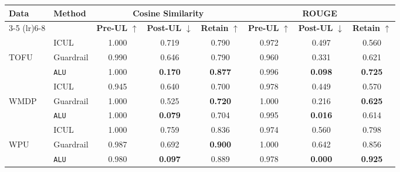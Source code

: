 \begin{table*}[]
    \centering
    \caption{Comparison of Methods using Cosine Similarity and ROUGE Metrics with Llama-3.1 8B}
    \begin{tabular}{llccc|ccc}
        \toprule
        \textbf{Data}&\textbf{Method} & \multicolumn{3}{c}{\textbf{Cosine Similarity}} & \multicolumn{3}{c}{\textbf{ROUGE}} \\
        \cmidrule(lr){3-5} \cmidrule(lr){6-8}
         & & \textbf{Pre-UL} $\uparrow$ & \textbf{Post-UL} $\downarrow$ & \textbf{Retain} $\uparrow$ & \textbf{Pre-UL} $\uparrow$ & \textbf{Post-UL} $\downarrow$ & \textbf{Retain} $\uparrow$ \\
        \midrule
        &ICUL & 1.000 & 0.719 & 0.790 & 0.972 & 0.497 & 0.560 \\
        TOFU &Guardrail & 0.990 & 0.646 & 0.790 & 0.960 & 0.331 & 0.621 \\
        &\texttt{ALU}  & 1.000 & \textbf{0.170} & \textbf{0.877} & 0.996 & \textbf{0.098} & \textbf{0.725} \\
        \midrule
        &ICUL  & 0.945 & 0.640 & 0.700 & 0.978 & 0.449 & 0.570 \\
        WMDP & Guardrail  & 1.000  & 0.525 & \textbf{0.720} & 1.000 & 0.216 & \textbf{0.625} \\
        &\texttt{ALU} & 1.000  & \textbf{0.079} & 0.704 & 0.995 & \textbf{0.016} & 0.614 \\
        \midrule
        &ICUL  & 1.000 & 0.759 & 0.836 & 0.974 & 0.560 & 0.798 \\
        WPU &Guardrail & 0.987 & 0.692 & \textbf{0.900} & 1.000 & 0.642 & 0.856 \\
        &\texttt{ALU} & 0.980 & \textbf{0.097} & 0.889 & 0.978 & \textbf{0.000} & \textbf{0.925} \\
        
        \bottomrule
    \end{tabular}
\label{tab:t10}    
\end{table*}


